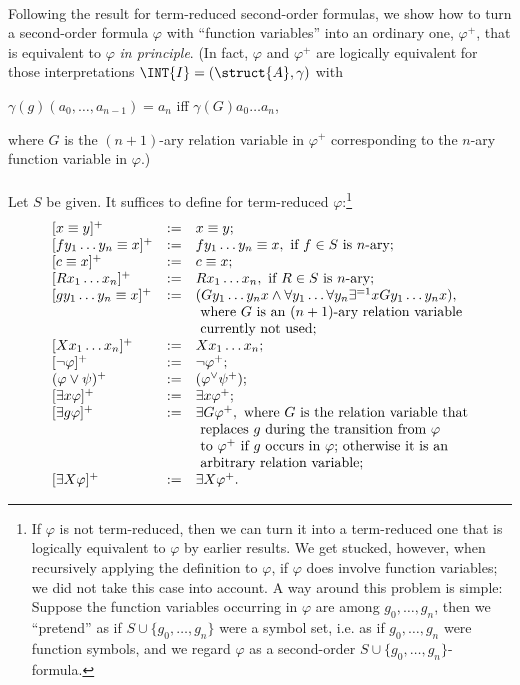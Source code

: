 \begin{enumerate}[1.]
\begin{enumerate}[(1)]
\ \\
Following the result for term-reduced second-order formulas, we show how to turn a second-order formula $\varphi$ with ``function variables'' into an ordinary one, $\varphi^+$, that is equivalent to $\varphi$ \emph{in principle}. (In fact, $\varphi$ and $\varphi^+$ are logically equivalent for those interpretations $\INT{I} = (\struct{A}, \gamma)$ with
\begin{center}
$\gamma(g) (a_0, \ldots, a_{n - 1}) = a_n$ iff $\gamma(G) a_0 \ldots a_n$,
\end{center}
where $G$ is the $(n + 1)$-ary relation variable in $\varphi^+$ corresponding to the $n$-ary function variable in $\varphi$.)
\\
\ \\
Let $S$ be given. It suffices to define for term-reduced $\varphi$:\footnote{If $\varphi$ is not term-reduced, then we can turn it into a term-reduced one that is logically equivalent to $\varphi$ by earlier results. We get stucked, however, when recursively applying the definition to $\varphi$, if $\varphi$ does involve function variables; we did not take this case into account. A way around this problem is simple: Suppose the function variables occurring in $\varphi$ are among $g_0, \ldots, g_n$, then we ``pretend'' as if $S \cup \{ g_0, \ldots, g_n \}$ were a symbol set, i.e. as if $g_0, \ldots, g_n$ were function symbols, and we regard $\varphi$ as a second-order $S \cup \{ g_0, \ldots, g_n \}$-formula.}
\[
\begin{array}{lll}
[x \equiv y]^+ & := & x \equiv y; \cr
[f y_1 \ldots y_n \equiv x]^+ & := & f y_1 \ldots y_n \equiv x, \mbox{ if $f \in S$ is $n$-ary}; \cr
[c \equiv x]^+ & := & c \equiv x; \cr
[R x_1 \ldots x_n]^+ & := & R x_1 \ldots x_n, \mbox{ if $R \in S$ is $n$-ary}; \cr
[g y_1 \ldots y_n \equiv x]^+ & := & (G y_1 \ldots y_n x \land \forall y_1 \ldots \forall y_n \exists^{=1} x G y_1 \ldots y_n x), \cr
\ & \ & \mbox{ where $G$ is an $(n + 1)$-ary relation variable} \cr
\ & \ & \mbox{ currently not used}; \cr
[X x_1 \ldots x_n]^+ & := & X x_1 \ldots x_n; \cr
[\neg \varphi]^+ & := & \neg \varphi^+; \cr
(\varphi \lor \psi)^+ & := & (\varphi^ \lor \psi^+); \cr
[\exists x \varphi]^+ & := & \exists x \varphi^+; \cr
[\exists g \varphi]^+ & := & \exists G \varphi^+, \ \mbox{where $G$ is the relation variable that} \cr
\ & \ & \ \mbox{replaces $g$ during the transition from $\varphi$} \cr
\ & \ & \ \mbox{to $\varphi^+$ if $g$ occurs in $\varphi$; otherwise it is an} \cr
\ & \ & \ \mbox{arbitrary relation variable}; \cr
[\exists X \varphi]^+ & := & \exists X \varphi^+.

\end{array}\]
\end{enumerate}
\end{enumerate}
